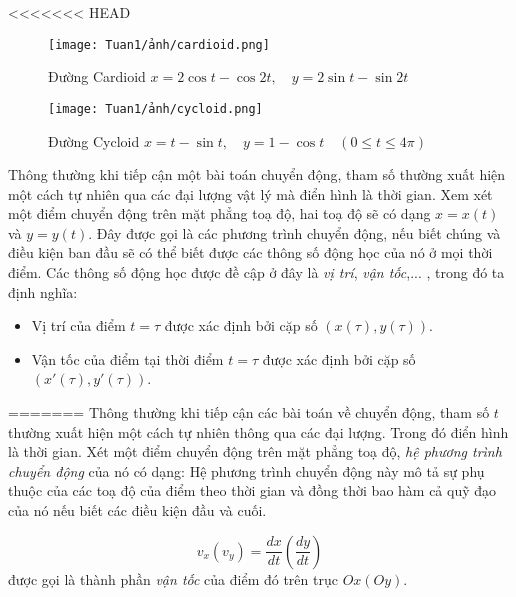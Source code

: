 <<<<<<< HEAD
\begin{figure}[H]
    \centering
    \texttt{[image: Tuan1/ảnh/cardioid.png]}
    \caption{Đường Cardioid\newline \hspace*{1em} $x = 2\cos t - \cos 2t,\quad y = 2\sin t - \sin 2t$}
\end{figure}

\begin{figure}[H]
    \centering
    \texttt{[image: Tuan1/ảnh/cycloid.png]}
    \caption{Đường Cycloid\newline \hspace*{1em} $x=t-\sin t,\quad y=1-\cos t\quad (0\leq t\leq 4\pi)$}
\end{figure}

Thông thường khi tiếp cận một bài toán chuyển động, tham số thường xuất hiện một cách tự nhiên qua các đại lượng vật lý mà điển hình là thời gian.\newline
Xem xét một điểm chuyển động trên mặt phẳng toạ độ,  hai toạ độ sẽ có dạng $x=x(t)$ và $y=y(t)$. Đây được gọi là các phương trình chuyển động, nếu biết chúng và điều kiện ban đầu sẽ có thể biết được các thông số động học của nó ở mọi thời điểm. Các thông số động học được đề cập ở đây là \emph{vị trí}, \emph{vận tốc},... , trong đó ta định nghĩa:
\begin{itemize}
    \item Vị trí của điểm $t=\tau$ được xác định bởi cặp số $(x(\tau),y(\tau))$.
    \item Vận tốc của điểm tại thời điểm $t=\tau$ được xác định bởi cặp số $(x'(\tau),y'(\tau))$.
\end{itemize}
=======
    Thông thường khi tiếp cận các bài toán về chuyển động, tham số $t$ thường xuất hiện một cách tự nhiên thông qua các đại lượng. Trong đó điển hình là thời gian.\newline
    Xét một điểm chuyển động trên mặt phẳng toạ độ, \emph{hệ phương trình chuyển động} của nó có dạng: \newline
    Hệ phương trình chuyển động này mô tả sự phụ thuộc của các toạ độ của điểm theo thời gian và đồng thời bao hàm cả quỹ đạo của nó nếu biết các điều kiện đầu và cuối.
    \begin{definition}
        \begin{equation}
            v_{x} (v_y)=\frac{dx}{dt}\left(\frac{dy}{dt}\right)
        \end{equation}
    được gọi là thành phần \emph{vận tốc} của điểm đó trên trục $Ox(Oy)$.
    \end{definition}
